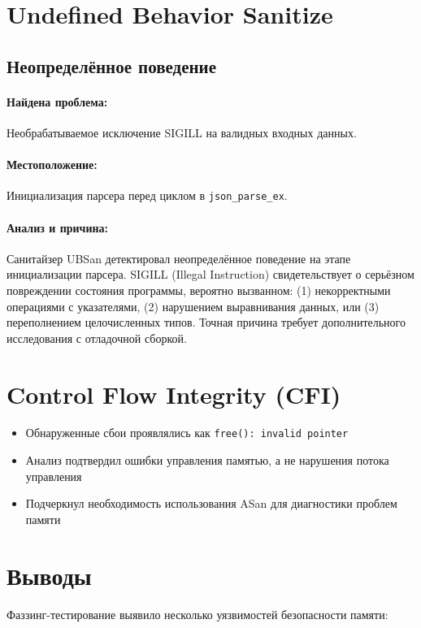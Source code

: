     \section{Undefined Behavior Sanitize}

    \subsection{Неопределённое поведение}

    \paragraph{Найдена проблема:} Необрабатываемое исключение SIGILL на валидных входных данных.

    \paragraph{Местоположение:} Инициализация парсера перед циклом в \texttt{json\_parse\_ex}.

    \paragraph{Анализ и причина:} Санитайзер UBSan детектировал неопределённое поведение на этапе инициализации парсера. SIGILL (Illegal Instruction) свидетельствует о серьёзном повреждении состояния программы, вероятно вызванном: (1) некорректными операциями с указателями, (2) нарушением выравнивания данных, или (3) переполнением целочисленных типов. Точная причина требует дополнительного исследования с отладочной сборкой.


    \section{Control Flow Integrity (CFI)}
    \begin{itemize}
        \item Обнаруженные сбои проявлялись как \texttt{free(): invalid pointer}
        \item Анализ подтвердил ошибки управления памятью, а не нарушения потока управления
        \item Подчеркнул необходимость использования ASan для диагностики проблем памяти
    \end{itemize}


    \section{Выводы}
    Фаззинг-тестирование выявило несколько уязвимостей безопасности памяти:

